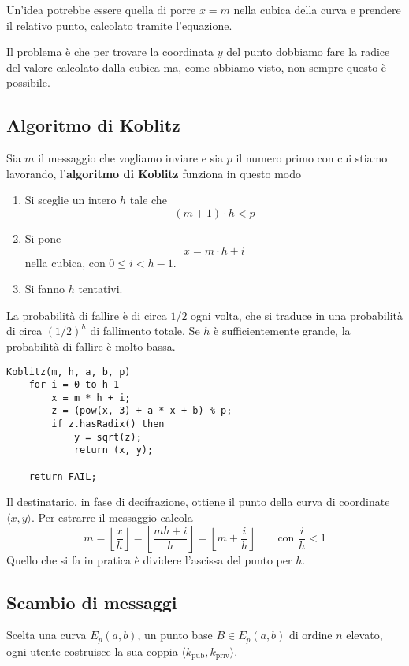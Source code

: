 Un'idea potrebbe essere quella di porre $x = m$ nella cubica della curva e prendere il relativo punto, calcolato
tramite l'equazione.

Il problema \`e che per trovare la coordinata $y$ del punto dobbiamo fare la radice del valore calcolato dalla
cubica ma, come abbiamo visto, non sempre questo \`e possibile.

\subsection{Algoritmo di Koblitz}
Sia $m$ il messaggio che vogliamo inviare e sia $p$ il numero primo con cui stiamo lavorando, l'\textbf{algoritmo
	di Koblitz} funziona in questo modo
\begin{enumerate}
	\item Si sceglie un intero $h$ tale che
	      \[ (m + 1) \cdot h < p \]
	\item Si pone
	      \[ x = m \cdot h + i \]
	      nella cubica, con $0 \leq i < h-1$.
	\item Si fanno $h$ tentativi.
\end{enumerate}
La probabilit\`a di fallire \`e di circa $1/2$ ogni volta, che si traduce in una probabilit\`a di circa $(1/2)^h$
di fallimento totale. Se $h$ \`e sufficientemente grande, la probabilit\`a di fallire \`e molto bassa.

\begin{lstlisting}[style=pseudo-style]
Koblitz(m, h, a, b, p)
	for i = 0 to h-1
		x = m * h + i;
		z = (pow(x, 3) + a * x + b) % p;
		if z.hasRadix() then 
			y = sqrt(z);
			return (x, y);

	return FAIL;
\end{lstlisting}
Il destinatario, in fase di decifrazione, ottiene il punto della curva di coordinate $\langle x, y \rangle$. Per
estrarre il messaggio calcola
\[
	m = \left\lfloor \frac{x}{h} \right\rfloor  =
	\left\lfloor \frac{mh + i}{h} \right\rfloor =
	\left\lfloor m + \frac{i}{h} \right\rfloor
	\quad \quad \text{con } \frac{i}{h} < 1
\]
Quello che si fa in pratica \`e dividere l'ascissa del punto per $h$.

\subsection{Scambio di messaggi}
Scelta una curva $E_p(a, b)$, un punto base $B \in E_p(a, b)$ di ordine $n$ elevato, ogni utente costruisce la sua
coppia $\langle k_\text{pub}, k_\text{priv} \rangle$.

